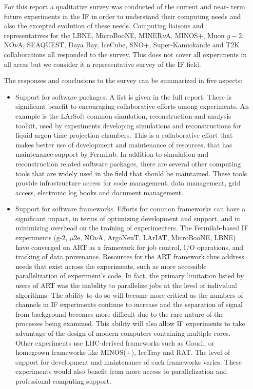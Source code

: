 For this report a qualitative survey was conducted of the current and near-
term future experiments in the IF in order to understand their computing needs
and also the excepted evolution of these needs.  Computing liaisons and
representatives for the LBNE, MicroBooNE, MINER$\nu$A, MINOS$+$, Muon $g-2$,
NO$\nu$A, SEAQUEST,  Daya Bay, IceCube, SNO+, Super-Kamiokande and T2K
collaborations all responded to the survey. This does not cover all
experiments in all areas but we consider it a representative survey of the IF
field.

The responses and conclusions to the survey can be summarized in five aspects:  

\begin{itemize} 
\item Support for software packages. A list is given in the
full report. There is significant benefit to encouraging collaborative efforts
among experiments. An example is the LArSoft common simulation,
reconstruction and analysis toolkit, used by experiments developing
simulations and reconstructions for liquid argon time projection chambers.
This is a collaborative effort that makes better use of development and
maintenance of resources, that has maintenance support by Fermilab.  In
addition to simulation and reconstruction related software packages, there are
several other computing tools that are widely used in the field that should be
maintained.  These tools provide infrastructure access for code management,
data management, grid access, electronic log books and document management.

\item Support for software frameworks. Efforts for common frameworks can have
a significant impact, in terms of optimizing  development and support, and in
minimizing overhead on the training of experimenters.  The Fermilab-based IF
experiments (g-2, $\mu2$e, NO$\nu$A, ArgoNeuT, LArIAT, MicroBooNE, LBNE) have
converged on ART as a framework for job control, I/O operations, and tracking
of data provenance. Resources for the ART framework thus address needs that
exist across the experiments, such as more accessible parallelization of
experiment's code. In fact, the primary limitation listed by users of ART was
the inability to parallelize jobs at the level of individual algorithms.  The
ability to do so will become more critical as the numbers of channels in IF
experiments continue to increase and the separation of signal from background
becomes more difficult due to the rare nature of the processes being examined.
This ability will also allow IF experiments to take advantage of the design of
modern computers containing multiple cores. Other experiments use LHC-derived
frameworks such as Gaudi, or homegrown frameworks like MINOS(+), IceTray and
RAT. The level of support for development and maintenance of such frameworks
varies. These experiments would also benefit from more access to
parallelization and professional computing support.


\end{itemize}
